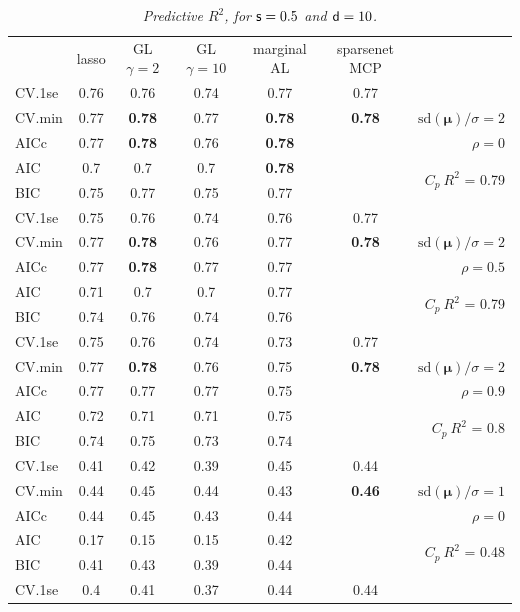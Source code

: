 \documentclass[12pt]{article}
\newcommand{\mr}[1]{\mathrm{#1}}
\newcommand{\bm}[1]{\mathbf{#1}}
\begin{document}
\begin{table}[p]\vspace{-.5cm}
\caption[l]{\it Predictive $R^2$, for ${\sf s}=0.5$ and  ${\sf d}=10$.}
\vspace{-.5cm}
\small{}
\begin{center}
\begin{tabular}{l*{5}{c}|r}
 & lasso & GL $\gamma=2$ & GL $\gamma=10$ & marginal AL & sparsenet MCP  &  \\
\cline{1-7}
CV.1se & 0.76 & 0.76 & 0.74 & 0.77 & 0.77 &\\
CV.min & 0.77 & {\bf 0.78} & 0.77 & {\bf 0.78} & {\bf 0.78} &  $\mr{sd}(\bm{\mu})/\sigma=2$ \\
AICc & 0.77 & {\bf 0.78} & 0.76 & {\bf 0.78} & & $\rho=0$ \\
AIC & 0.7 & 0.7 & 0.7 & {\bf 0.78} & & \multirow{2}{*}{$C_p ~ R^2$ = 0.79} \\
BIC & 0.75 & 0.77 & 0.75 & 0.77 & & \\
 \hline 
CV.1se & 0.75 & 0.76 & 0.74 & 0.76 & 0.77 &\\
CV.min & 0.77 & {\bf 0.78} & 0.76 & 0.77 & {\bf 0.78} &  $\mr{sd}(\bm{\mu})/\sigma=2$ \\
AICc & 0.77 & {\bf 0.78} & 0.77 & 0.77 & & $\rho=0.5$ \\
AIC & 0.71 & 0.7 & 0.7 & 0.77 & & \multirow{2}{*}{$C_p ~ R^2$ = 0.79} \\
BIC & 0.74 & 0.76 & 0.74 & 0.76 & & \\
 \hline 
CV.1se & 0.75 & 0.76 & 0.74 & 0.73 & 0.77 &\\
CV.min & 0.77 & {\bf 0.78} & 0.76 & 0.75 & {\bf 0.78} &  $\mr{sd}(\bm{\mu})/\sigma=2$ \\
AICc & 0.77 & 0.77 & 0.77 & 0.75 & & $\rho=0.9$ \\
AIC & 0.72 & 0.71 & 0.71 & 0.75 & & \multirow{2}{*}{$C_p ~ R^2$ = 0.8} \\
BIC & 0.74 & 0.75 & 0.73 & 0.74 & & \\
 \hline 
CV.1se & 0.41 & 0.42 & 0.39 & 0.45 & 0.44 &\\
CV.min & 0.44 & 0.45 & 0.44 & 0.43 & {\bf 0.46} &  $\mr{sd}(\bm{\mu})/\sigma=1$ \\
AICc & 0.44 & 0.45 & 0.43 & 0.44 & & $\rho=0$ \\
AIC & 0.17 & 0.15 & 0.15 & 0.42 & & \multirow{2}{*}{$C_p ~ R^2$ = 0.48} \\
BIC & 0.41 & 0.43 & 0.39 & 0.44 & & \\
 \hline 
CV.1se & 0.4 & 0.41 & 0.37 & 0.44 & 0.44 &\\

\end{tabular}
\end{center}
\end{table}
\end{document}
